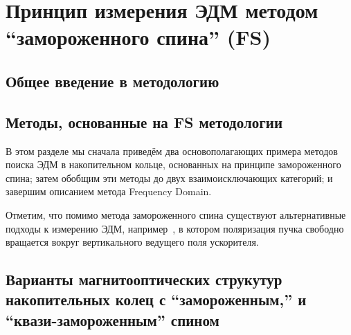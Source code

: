 \chapter{Принцип измерения ЭДМ методом ``замороженного спина'' (FS)}\label{chpt1:top-level}

\section{Общее введение в методологию}\label{chpt1:FS-introduction}


\section{Методы, основанные на FS методологии}\label{chpt1:FS-methods}
В этом разделе мы сначала приведём два основополагающих примера методов поиска ЭДМ
в накопительном кольце, основанных на принципе замороженного спина;
затем обобщим  эти методы до двух взаимоисключающих категорий;
и завершим описанием метода Frequency Domain.

Отметим, что помимо метода замороженного спина существуют альтернативные подходы к измерению ЭДМ, например~\cite{COSY:SpinTuneMapping, COSY:Partially-Frozen-Spin}, в котором поляризация пучка свободно вращается вокруг вертикального ведущего поля ускорителя.



\section{Варианты магнитооптических струкутур накопительных колец с ``замороженным,'' и ``квази-замороженным'' спином} \label{chpt1:Lattices}



\clearpage